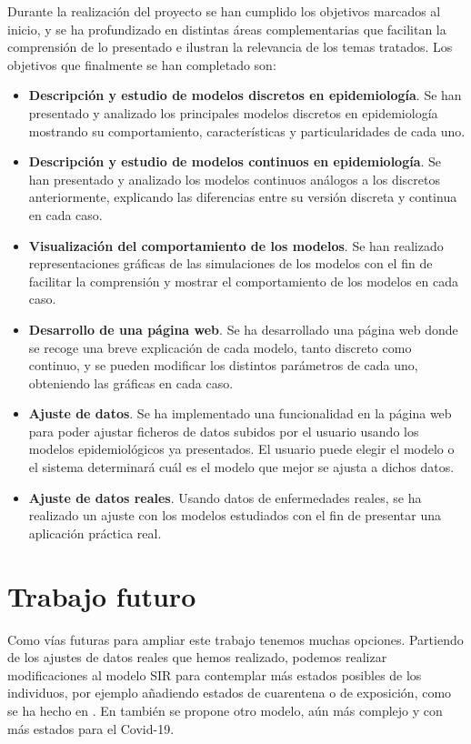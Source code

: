 Durante la realización del proyecto se han cumplido los objetivos marcados al inicio, y se ha profundizado en distintas áreas complementarias que facilitan la comprensión de lo presentado e ilustran la relevancia de los temas tratados. Los objetivos que finalmente se han completado son:

\begin{itemize}
\item \textbf{Descripción y estudio de modelos discretos en epidemiología}. Se han presentado y analizado los principales modelos discretos en epidemiología mostrando su comportamiento, características y particularidades de cada uno.
\item \textbf{Descripción y estudio de modelos continuos en epidemiología}. Se han presentado y analizado los modelos continuos análogos a los discretos anteriormente, explicando las diferencias entre su versión discreta y continua en cada caso.
\item \textbf{Visualización del comportamiento de los modelos}. Se han realizado representaciones gráficas de las simulaciones de los modelos con el fin de facilitar la comprensión y mostrar el comportamiento de los modelos en cada caso.
\item \textbf{Desarrollo de una página web}. Se ha desarrollado una página web donde se recoge una breve explicación de cada modelo, tanto discreto como continuo, y se pueden modificar los distintos parámetros de cada uno, obteniendo las gráficas en cada caso.
\item \textbf{Ajuste de datos}. Se ha implementado una funcionalidad en la página web para poder ajustar ficheros de datos subidos por el usuario usando los modelos epidemiológicos ya presentados. El usuario puede elegir el modelo o el sistema determinará cuál es el modelo que mejor se ajusta a dichos datos.
\item \textbf{Ajuste de datos reales}. Usando datos de enfermedades reales, se ha realizado un ajuste con los modelos estudiados con el fin de presentar una aplicación práctica real.
\end{itemize}

\section{Trabajo futuro}

Como vías futuras para ampliar este trabajo tenemos muchas opciones. Partiendo de los ajustes de datos reales que hemos realizado, podemos realizar modificaciones al modelo SIR para contemplar más estados posibles de los individuos, por ejemplo añadiendo estados de cuarentena o de exposición, como se ha hecho en \cite{gutierrez2020analisis}. En \cite{RAMOS2021105937} también se propone otro modelo, aún más complejo y con más estados para el Covid-19.

